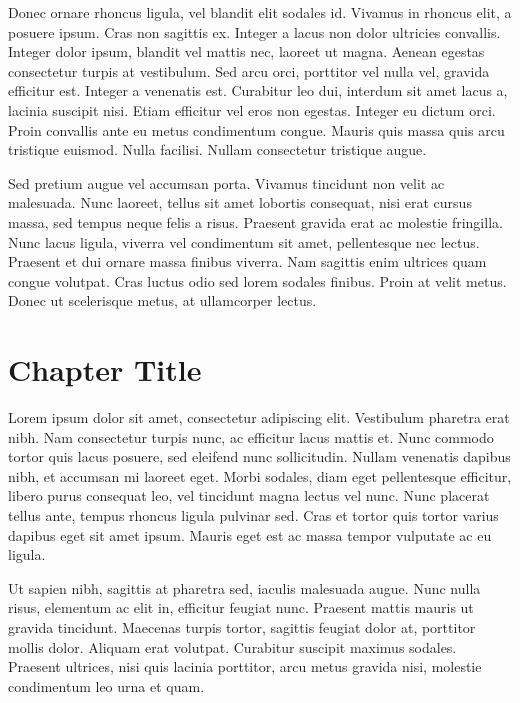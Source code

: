 \documentclass[a4paper]{memoir}
\begin{document}
Donec ornare rhoncus ligula, vel blandit elit sodales id. Vivamus in rhoncus elit, a posuere ipsum. Cras non sagittis ex. Integer a lacus non dolor ultricies convallis. Integer dolor ipsum, blandit vel mattis nec, laoreet ut magna. Aenean egestas consectetur turpis at vestibulum. Sed arcu orci, porttitor vel nulla vel, gravida efficitur est. Integer a venenatis est. Curabitur leo dui, interdum sit amet lacus a, lacinia suscipit nisi. Etiam efficitur vel eros non egestas. Integer eu dictum orci. Proin convallis ante eu metus condimentum congue. Mauris quis massa quis arcu tristique euismod. Nulla facilisi. Nullam consectetur tristique augue. 

Sed pretium augue vel accumsan porta. Vivamus tincidunt non velit ac malesuada. Nunc laoreet, tellus sit amet lobortis consequat, nisi erat cursus massa, sed tempus neque felis a risus. Praesent gravida erat ac molestie fringilla. Nunc lacus ligula, viverra vel condimentum sit amet, pellentesque nec lectus. Praesent et dui ornare massa finibus viverra. Nam sagittis enim ultrices quam congue volutpat. Cras luctus odio sed lorem sodales finibus. Proin at velit metus. Donec ut scelerisque metus, at ullamcorper lectus. 

\chapter{Chapter Title}
\label{chaptertitle}

Lorem ipsum dolor sit amet, consectetur adipiscing elit. Vestibulum pharetra erat nibh. Nam consectetur turpis nunc, ac efficitur lacus mattis et. Nunc commodo tortor quis lacus posuere, sed eleifend nunc sollicitudin. Nullam venenatis dapibus nibh, et accumsan mi laoreet eget. Morbi sodales, diam eget pellentesque efficitur, libero purus consequat leo, vel tincidunt magna lectus vel nunc. Nunc placerat tellus ante, tempus rhoncus ligula pulvinar sed. Cras et tortor quis tortor varius dapibus eget sit amet ipsum. Mauris eget est ac massa tempor vulputate ac eu ligula. 

Ut sapien nibh, sagittis at pharetra sed, iaculis malesuada augue. Nunc nulla risus, elementum ac elit in, efficitur feugiat nunc. Praesent mattis mauris ut gravida tincidunt. Maecenas turpis tortor, sagittis feugiat dolor at, porttitor mollis dolor. Aliquam erat volutpat. Curabitur suscipit maximus sodales. Praesent ultrices, nisi quis lacinia porttitor, arcu metus gravida nisi, molestie condimentum leo urna et quam. 
\end{document}
